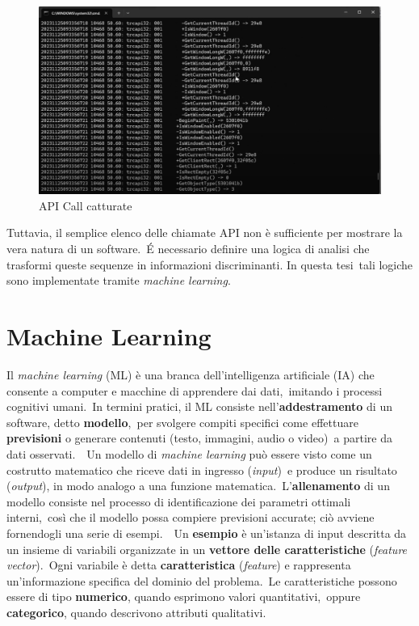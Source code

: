 \begin{figure}[htbp]
      \centering
      \includegraphics[width=1\textwidth]{./stato-dell-arte/imgs/api_call_example.png}
      \caption{API Call catturate}
      \label{fig:api_call_example}
\end{figure}

Tuttavia, il semplice elenco delle chiamate API non è sufficiente per mostrare la vera natura di un software.\
É necessario definire una logica di analisi che trasformi queste sequenze in informazioni discriminanti. In questa tesi\
tali logiche sono implementate tramite \textit{machine learning}.

\section{Machine Learning}

Il \textit{machine learning} (ML) è una branca dell'intelligenza artificiale (IA) che consente a computer e macchine di apprendere dai dati,\
imitando i processi cognitivi umani.\
In termini pratici, il ML consiste nell'\textbf{addestramento} di un software, detto \textbf{modello},\
per svolgere compiti specifici come effettuare \textbf{previsioni} o generare contenuti (testo, immagini, audio o video)\
a partire da dati osservati.\
\
Un modello di \textit{machine learning} può essere visto come un costrutto matematico che riceve dati in ingresso (\textit{input})\
e produce un risultato (\textit{output}), in modo analogo a una funzione matematica.\
L'\textbf{allenamento} di un modello consiste nel processo di identificazione dei parametri ottimali interni,\
così che il modello possa compiere previsioni accurate; ciò avviene fornendogli una serie di esempi.\
\
Un \textbf{esempio} è un'istanza di input descritta da un insieme di variabili organizzate in un \textbf{vettore delle caratteristiche}
(\textit{feature vector}).\
Ogni variabile è detta \textbf{caratteristica} (\textit{feature}) e rappresenta un'informazione specifica del dominio del problema.\
Le caratteristiche possono essere di tipo \textbf{numerico}, quando esprimono valori quantitativi,\
oppure \textbf{categorico}, quando descrivono attributi qualitativi.


